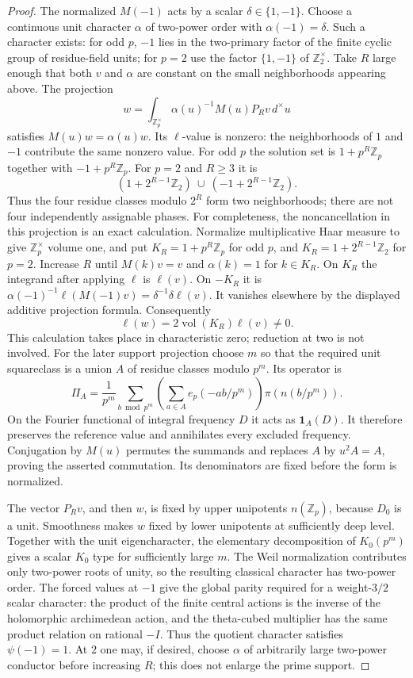 \documentclass[11pt]{article}
\theoremstyle{definition}
\theoremstyle{remark}
\newcommand{\Z}{\mathbb Z}
\begin{document}
\begin{proof}
The normalized $M(-1)$ acts by a scalar $\delta\in\{1,-1\}$.
Choose a continuous unit character $\alpha$ of two-power order
with $\alpha(-1)=\delta$. Such a character exists: for odd $p$,
$-1$ lies in the two-primary factor of the finite cyclic group
of residue-field units; for $p=2$ use the factor
$\{1,-1\}$ of $\Z_2^\times$.
Take $R$ large enough that both $v$ and $\alpha$ are constant on
the small neighborhoods appearing above. The projection
\[
 w=\int_{\Z_p^\times}\alpha(u)^{-1}M(u)P_Rv\,d^\times u
\]
satisfies $M(u)w=\alpha(u)w$. Its $\ell$-value is nonzero:
the neighborhoods of $1$ and $-1$ contribute the same nonzero
value. For odd $p$ the solution set is
$1+p^R\Z_p$ together with $-1+p^R\Z_p$.
For $p=2$ and $R\ge3$ it is
\[
 (1+2^{R-1}\Z_2)\ \cup\
 (-1+2^{R-1}\Z_2).
\]
Thus the four residue classes modulo $2^R$ form two neighborhoods;
there are not four independently assignable phases.
For completeness, the noncancellation in this projection is an exact
calculation. Normalize multiplicative Haar measure to give
$\Z_p^\times$ volume one, and put
$K_R=1+p^R\Z_p$ for odd $p$, and $K_R=1+2^{R-1}\Z_2$
for $p=2$. Increase $R$ until $M(k)v=v$ and $\alpha(k)=1$
for $k\in K_R$. On $K_R$ the integrand after applying $\ell$
is $\ell(v)$. On $-K_R$ it is
$\alpha(-1)^{-1}\ell(M(-1)v)=\delta^{-1}\delta\ell(v)$.
It vanishes elsewhere by the displayed additive projection formula.
Consequently
\[
                 \ell(w)=2\operatorname{vol}(K_R)\ell(v)\ne0.
\]
This calculation takes place in characteristic zero; reduction at two
is not involved. For the later support projection choose $m$ so that
the required unit squareclass is a union $A$ of residue classes modulo
$p^m$. Its operator is
\[
 \Pi_A=\frac1{p^m}\sum_{b\bmod p^m}
       \left(\sum_{a\in A}e_p(-ab/p^m)\right)\pi(n(b/p^m)).
\]
On the Fourier functional of integral frequency $D$ it acts as
$\mathbf1_A(D)$. It therefore preserves the reference value and
annihilates every excluded frequency. Conjugation by $M(u)$ permutes
the summands and replaces $A$ by $u^2A=A$, proving the asserted
commutation. Its denominators are fixed before the form is normalized.


The vector $P_Rv$, and then $w$, is fixed by upper unipotents
$n(\Z_p)$, because $D_0$ is a unit. Smoothness makes $w$
fixed by lower unipotents at sufficiently deep level. Together with
the unit eigencharacter, the elementary decomposition of
$K_0(p^m)$ gives a scalar $K_0$ type for sufficiently large $m$.
The Weil normalization contributes only two-power roots of unity,
so the resulting classical character has two-power order.
The forced values at $-1$ give the global parity required for a
weight-$3/2$ scalar character: the product of the finite central
actions is the inverse of the holomorphic archimedean action,
and the theta-cubed multiplier has the same product relation
on rational $-I$. Thus the quotient character satisfies
$\psi(-1)=1$. At $2$ one may, if desired, choose
$\alpha$ of arbitrarily large two-power conductor before increasing
$R$; this does not enlarge the prime support.


\end{proof}
\end{document}
